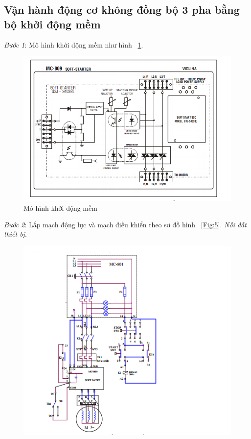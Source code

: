 \documentclass[13pt,a4paper]{extarticle}
\begin{document}
\subsection{Vận hành động cơ không đồng bộ 3 pha bằng bộ khởi động mềm}
\begin{list}{--}{}
\item \textit{Bước 1}: Mô hình khởi động mềm như hình ~\ref{Fig:4}.
\begin{figure}[!h]
\begin{center}
\includegraphics[scale=.6]{4}
\end{center}
\caption{Mô hình khởi động mềm}\label{Fig:4}
\end{figure}
\item \textit{Bước 2}: Lắp mạch động lực và mạch điều khiển theo sơ đồ hình ~\ref{Fig:5}. \textit{Nối đất thiết bị}.
\begin{figure}[!h]
\begin{center}
\includegraphics[scale=1.5]{5}

\end{center}
\end{figure}
\end{list}
\end{document}
